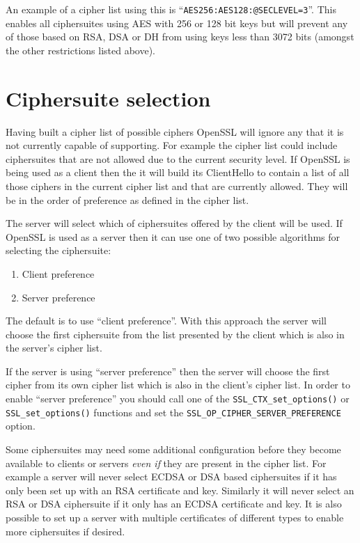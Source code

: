 An example of a cipher list using this is ``\verb!AES256:AES128:@SECLEVEL=3!''. 
This enables all ciphersuites using AES with 256 or 128 bit keys but will 
prevent any of those based on RSA, DSA or DH from using keys less than 3072 
bits (amongst the other restrictions listed above).

\section{Ciphersuite selection}

Having built a cipher list of possible ciphers OpenSSL will ignore any that it 
is not currently capable of supporting. For example the cipher list could 
include ciphersuites that are not allowed due to the current security level. If 
OpenSSL is being used as a client then the it will build its ClientHello to 
contain a list of all those ciphers in the current cipher list and that are 
currently allowed. They will be in the order of preference as defined in the
cipher list.

The server will select which of ciphersuites offered by the client will be 
used. If OpenSSL is used as a server then it can use one of two possible 
algorithms for selecting the ciphersuite:
\begin{enumerate}
\item Client preference
\item Server preference
\end{enumerate}

The default is to use ``client preference''. With this approach the server will 
choose the first ciphersuite from the list presented by the client which is 
also in the server's cipher list.

If the server is using ``server preference'' then the server will choose the 
first cipher from its own cipher list which is also in the client's cipher 
list. In order to enable ``server preference'' you should call one of the
\verb!SSL_CTX_set_options()! or \verb!SSL_set_options()! functions and set
the \verb!SSL_OP_CIPHER_SERVER_PREFERENCE! option.

Some ciphersuites may need some additional configuration before they become 
available to clients or servers \emph{even if} they are present in the cipher 
list. For example a server will never select ECDSA or DSA based ciphersuites if
it has only been set up with an RSA certificate and key. Similarly it will never
select an RSA or DSA ciphersuite if it only has an ECDSA certificate and key. It
is also possible to set up a server with multiple certificates of different
types to enable more ciphersuites if desired.


